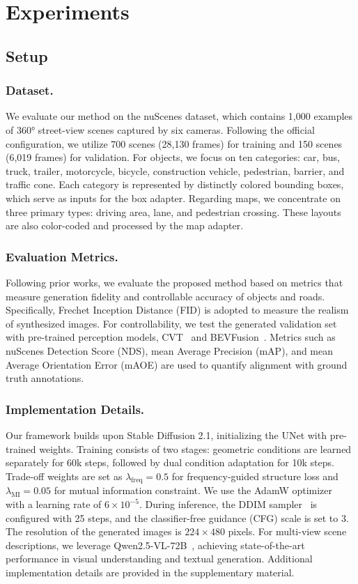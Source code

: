 \section{Experiments}
\subsection{Setup}
\subsubsection{Dataset.} 
We evaluate our method on the nuScenes dataset, which contains 1,000 examples of 360° street-view scenes captured by six cameras. Following the official configuration, we utilize 700 scenes (28,130 frames) for training and 150 scenes (6,019 frames) for validation. 
For objects, we focus on ten categories: car, bus, truck, trailer, motorcycle, bicycle, construction vehicle, pedestrian, barrier, and traffic cone. Each category is represented by distinctly colored bounding boxes, which serve as inputs for the box adapter. 
Regarding maps, we concentrate on three primary types: driving area, lane, and pedestrian crossing. These layouts are also color-coded and processed by the map adapter.
\subsubsection{Evaluation Metrics.} 
Following prior works, we evaluate the proposed method based on metrics that measure  generation fidelity and controllable accuracy of objects and roads. 
Specifically, Frechet Inception Distance (FID) is adopted to measure the realism of synthesized images.
For controllability, we test the generated validation set with pre-trained perception models, CVT~\cite{zhou2022cross} and BEVFusion~\cite{liu2022bevfusion}. 
Metrics such as nuScenes Detection Score (NDS), mean Average Precision (mAP), and mean Average Orientation Error (mAOE) are used to quantify alignment with ground truth annotations.
\subsubsection{Implementation Details.}
Our framework builds upon Stable Diffusion 2.1, initializing the UNet with pre-trained weights. 
Training consists of two stages: geometric conditions are learned separately for 60k steps, followed by dual condition adaptation for 10k steps. 
Trade-off weights are set as $\lambda_\text{freq} = 0.5$ for frequency-guided structure loss and $\lambda_\text{MI} = 0.05$ for mutual information constraint.
We use the AdamW optimizer~\cite{loshchilov2017decoupled} with a learning rate of $6 \times 10^{-5}$. During inference, the DDIM sampler~\cite{songdenoising} is configured with 25 steps, and the classifier-free guidance (CFG) scale is set to 3. The resolution of the generated images is $224 \times 480$ pixels.
For multi-view scene descriptions, we leverage Qwen2.5-VL-72B~\cite{bai2025qwen2}, achieving state-of-the-art performance in visual understanding and textual generation. Additional implementation details are provided in the supplementary material.


